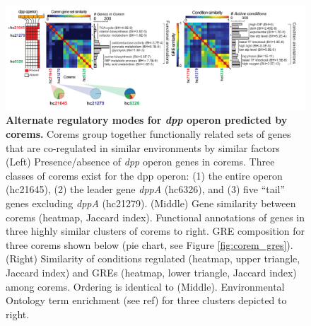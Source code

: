 \begin{figure}[h!]
\centering
\includegraphics[width=0.95\linewidth]{figures/dpp_heatmaps.pdf}
\caption[Alternate regulatory modes for \textit{dpp} operon predicted by corems]{\textbf{Alternate regulatory modes for \textit{dpp} operon predicted by corems.} Corems group together functionally related sets of genes that are co-regulated in similar environments by similar factors (Left) Presence/absence of \textit{dpp} operon genes in corems. Three classes of corems exist for the dpp operon: (1) the entire operon (\eg hc21645), (2) the leader gene \textit{dppA} (\eg hc6326), and (3) five ``tail'' genes excluding \textit{dppA} (hc21279). (Middle) Gene similarity between corems (heatmap, Jaccard index). Functional annotations of genes in three highly similar clusters of corems to right. GRE composition for three corems shown below (pie chart, see Figure \ref{fig:corem_gres}). (Right) Similarity of conditions regulated (heatmap, upper triangle, Jaccard index) and GREs (heatmap, lower triangle, Jaccard index) among corems. Ordering is identical to (Middle). Environmental Ontology term enrichment (see ref{}) for three clusters depicted to right.}
\label{fig:dpp_heatmaps}
\end{figure}

